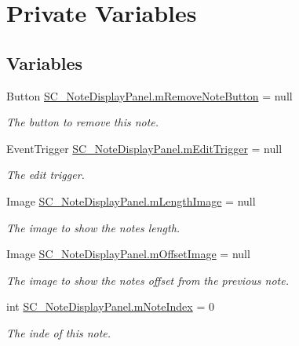 \hypertarget{group___s_c___n_d_p_priv_var}{}\section{Private Variables}
\label{group___s_c___n_d_p_priv_var}
\subsection*{Variables}
\begin{DoxyCompactItemize}
\item 
Button \hyperlink{group___s_c___n_d_p_priv_var_gac9af0bdc5b04a52ab9e7c13a0ad01ab7}{S\+C\+\_\+\+Note\+Display\+Panel.\+m\+Remove\+Note\+Button} = null
\begin{DoxyCompactList}\small\item\em The button to remove this note. \end{DoxyCompactList}\item 
Event\+Trigger \hyperlink{group___s_c___n_d_p_priv_var_ga3dd3e8ce9fbbe9b6b11d87e28df7dcfa}{S\+C\+\_\+\+Note\+Display\+Panel.\+m\+Edit\+Trigger} = null
\begin{DoxyCompactList}\small\item\em The edit trigger. \end{DoxyCompactList}\item 
Image \hyperlink{group___s_c___n_d_p_priv_var_ga611f26eaf6a960570b0dd848b6712b5f}{S\+C\+\_\+\+Note\+Display\+Panel.\+m\+Length\+Image} = null
\begin{DoxyCompactList}\small\item\em The image to show the note\textquotesingle{}s length. \end{DoxyCompactList}\item 
Image \hyperlink{group___s_c___n_d_p_priv_var_ga177d14cf2cac316a0bfc2e1096256a0c}{S\+C\+\_\+\+Note\+Display\+Panel.\+m\+Offset\+Image} = null
\begin{DoxyCompactList}\small\item\em The image to show the note\textquotesingle{}s offset from the previous note. \end{DoxyCompactList}\item 
int \hyperlink{group___s_c___n_d_p_priv_var_ga11933919195aba904a4e8bf95f131e49}{S\+C\+\_\+\+Note\+Display\+Panel.\+m\+Note\+Index} = 0
\begin{DoxyCompactList}\small\item\em The inde of this note. \end{DoxyCompactList}\item 

\end{DoxyCompactItemize}
